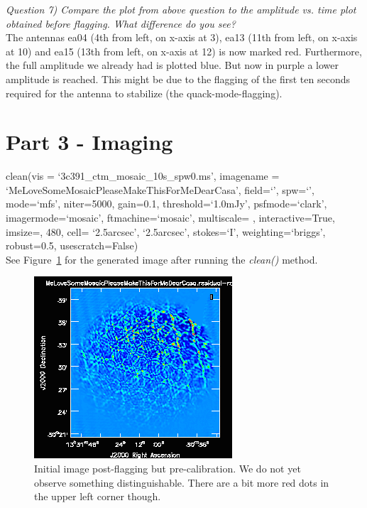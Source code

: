 \documentclass[12pt, a4paper]{article}
\begin{document}
\noindent \textit{Question 7) Compare the plot from above question to the amplitude vs. time plot obtained before flagging. What difference do you see?} \\
The antennas ea04 (4th from left, on x-axis at 3), ea13 (11th from left, on x-axis at 10) and ea15 (13th from left, on x-axis at 12) is now marked red. Furthermore, the full amplitude we already had is plotted blue. But now in purple a lower amplitude is reached. This might be due to the flagging of the first ten seconds required for the antenna to stabilize (the quack-mode-flagging). \\

\newpage

\section{Part 3 - Imaging}
clean(vis = `3c391\_ctm\_mosaic\_10s\_spw0.ms', imagename = `MeLoveSomeMosaicPleaseMakeThisForMeDearCasa', field=`', spw=`', mode=`mfs', niter=5000, gain=0.1, threshold=`1.0mJy', psfmode=`clark', imagermode=`mosaic', ftmachine=`mosaic', multiscale= \rbrack, interactive=True, imsize=, 480\rbrack, cell= \lbrack `2.5arcsec', `2.5arcsec'\rbrack, stokes=`I', weighting=`briggs', robust=0.5, usescratch=False) \\

\noindent See Figure~\ref{fig:part3} for the generated image after running the \emph{clean()} method.

\begin{figure}
    \centering
    \includegraphics[scale=0.7]{../Imaging/plots/MosaicImagedPart3.png}
    \caption{Initial image post-flagging but pre-calibration. We do not yet observe something distinguishable. There are a bit more red dots in the upper left corner though. \label{fig:part3}}
\end{figure}
\end{document}
